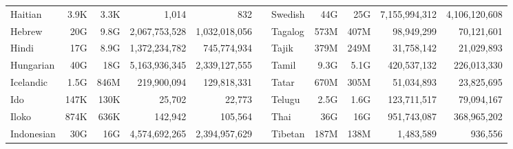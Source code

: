 \begin{table*}[t!]
{\begin{tabular}{@{}lrrrrclrrrr@{}}
            Haitian                   & 3.9K                     & 3.3K                      & 1,014                    & 832                       &                          & Swedish                   & 44G                      & 25G                       & 7,155,994,312            & 4,106,120,608             \\
            Hebrew                    & 20G                      & 9.8G                      & 2,067,753,528            & 1,032,018,056             &                          & Tagalog                   & 573M                     & 407M                      & 98,949,299               & 70,121,601                \\
            Hindi                     & 17G                      & 8.9G                      & 1,372,234,782            & 745,774,934               &                          & Tajik                     & 379M                     & 249M                      & 31,758,142               & 21,029,893                \\
            Hungarian                 & 40G                      & 18G                       & 5,163,936,345            & 2,339,127,555             &                          & Tamil                     & 9.3G                     & 5.1G                      & 420,537,132              & 226,013,330               \\
            Icelandic                 & 1.5G                     & 846M                      & 219,900,094              & 129,818,331               &                          & Tatar                     & 670M                     & 305M                      & 51,034,893               & 23,825,695                \\
            Ido                       & 147K                     & 130K                      & 25,702                   & 22,773                    &                          & Telugu                    & 2.5G                     & 1.6G                      & 123,711,517              & 79,094,167                \\
            Iloko                     & 874K                     & 636K                      & 142,942                  & 105,564                   &                          & Thai                      & 36G                      & 16G                       & 951,743,087              & 368,965,202               \\
            Indonesian                & 30G                      & 16G                       & 4,574,692,265            & 2,394,957,629             &                          & Tibetan                   & 187M                     & 138M                      & 1,483,589                & 936,556                   \\

\end{tabular}}
\end{table*}
